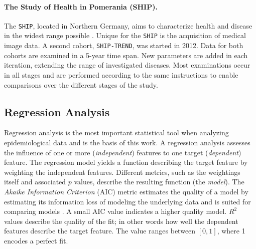 \documentclass[journal]{style/vgtc} 			          %
\begin{document}
\paragraph{The Study of Health in Pomerania (SHIP).}
The \texttt{SHIP}, located in Northern Germany, aims to characterize health and disease in the widest range possible \cite{Volzke2011}.
Unique for the \texttt{SHIP} is the acquisition of medical image data.
A second cohort, \texttt{SHIP-TREND}, was started in 2012.
Data for both cohorts are examined in a 5-year time span.
New parameters are added in each iteration, extending the range of investigated diseases.
Most examinations occur in all stages and are performed according to the same instructions to enable comparisons over the different stages of the study.

\subsection{Regression Analysis} \label{sec:RegressionAnalysis}
Regression analysis is the most important statistical tool when analyzing epidemiological data and is the basis of this work.
A regression analysis assesses the influence of one or more (\emph{independent}) features to one target (\emph{dependent}) feature.
The regression model yields a function describing the target feature by weighting the independent features.
Different metrics, such as the weightings itself and associated $p$ values, describe the resulting function (the \emph{model}).
The \emph{Akaike Information Criterion} (AIC) metric estimates the quality of a model by estimating its information loss of modeling the underlying data and is suited for comparing models \cite{Akaike}.
A small AIC value indicates a higher quality model.
$R^2$ values describe the quality of the fit; in other words how well the dependent features describe the target feature.
The value ranges between $[0, 1]$, where 1 encodes a perfect fit.
\end{document}
